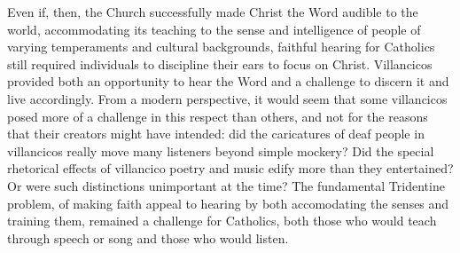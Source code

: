 Even if, then, the Church successfully made Christ the Word audible to the world,
accommodating its teaching to the sense and intelligence of people of varying
temperaments and cultural backgrounds, faithful hearing for Catholics still required
individuals to discipline their ears to focus on Christ.
Villancicos provided both an opportunity to hear the Word and a challenge to
discern it and live accordingly.
From a modern perspective, it would seem that some villancicos posed more of a
challenge in this respect than others, and not for the reasons that their
creators might have intended: did the caricatures of deaf people in villancicos
really move many listeners beyond simple mockery?
Did the special rhetorical effects of villancico poetry and music edify more
than they entertained?
Or were such distinctions unimportant at the time?
The fundamental Tridentine problem, of making faith appeal to hearing by both 
accomodating the senses and training them, remained a challenge for Catholics, 
both those who would teach through speech or song and those who would listen.


